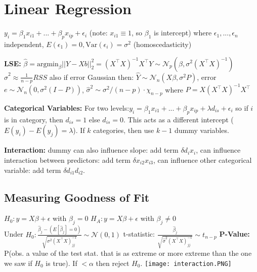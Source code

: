 \section*{Linear Regression}
$y_i = \beta_1 x_{i1}+...+\beta_p x_{ip} + \epsilon_i$ (note: $x_{i1}\equiv 1$, so $\beta_1$ is intercept) where $\epsilon_1,...,\epsilon_n$ independent, $E(\epsilon_1)=0, \text{Var} (\epsilon_i)=\sigma^2$ (homoscedasticity)

\textbf{LSE:} $\hat \beta = \text{argmin}_\beta ||Y-Xb||_2^2 = (X^\top X)^{-1}X^\top Y \sim \mathcal{N}_p(\beta, \sigma^2 (X^\top X)^{-1})$ \\
$\hat \sigma^2 \approx \frac 1 {n-p}RSS$
also if error Gaussian then: $\hat Y \sim \mathcal{N}_n(X\beta, \sigma^2 P)$, error\\
$e \sim \mathcal{N}_n(0, \sigma^2(I-P))$,
$\hat \sigma^2 \sim {\sigma^2 }/{(n-p)}\cdot \chi_{n-p}$
where $P=X(X^\top X)^{-1}X^\top $

\textbf{Categorical Variables:} 
For two levels:$y_i = \beta_1 x_{i1}+...+\beta_p x_{ip} + \lambda d_{is} + \epsilon_i$ 
so if $i$ is in category, then $d_{is}=1$ else $d_{is}=0$. This acts as a different intercept ($E(y_i)-E(y_j)=\lambda$). If $k$ categories, then use $k-1$ dummy variables.

\textbf{Interaction:} dummy can also influence slope: add term $\delta d_i x_i$, can influence interaction between predictors: add term $\delta x_{i2} x_{i3}$, can influence other categorical variable: add term $\delta d_{i1}d_{i2}$.

\subsection*{Measuring Goodness of Fit}
$H_0: y = X\beta + \epsilon$ with $\beta_j=0$
$H_A: y = X\beta + \epsilon$ with $\beta_j\neq 0$\\
Under $H_0: \frac{\hat \beta_j - (E[\hat \beta_j]=0)}{\sqrt{\sigma^2(X^\top X)^{-1}_{jj}}} \sim \mathcal{N}(0,1)$
t-statistic: $\frac{\hat \beta_j}{\sqrt{\hat \sigma^2 (X^\top X)^{-1}_{jj}}} \sim t_{n-p}$
\textbf{P-Value:} P(obs. a value of the test stat. that is as extreme or more extreme than the one we saw if $H_0$ is true).
If $< \alpha$ then reject $H_0$.
\texttt{[image: interaction.PNG]}

